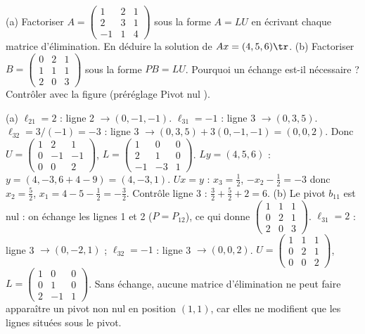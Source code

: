 \begin{exo}[S][$A=LU$ et $PA=LU$]
(a) Factoriser $A=\begin{pmatrix}1&2&1\\2&3&1\\-1&1&4\end{pmatrix}$ sous la forme $A=LU$ en écrivant chaque matrice d'élimination. En déduire la solution de $Ax=(4,5,6)\tr$.
(b) Factoriser $B=\begin{pmatrix}0&2&1\\1&1&1\\2&0&3\end{pmatrix}$ sous la forme $PB=LU$. Pourquoi un échange est-il nécessaire ? Contrôler avec la figure (préréglage \og Pivot nul \fg).
\begin{corrige}
(a) $\ell_{21}=2$ : ligne 2 $\to(0,-1,-1)$. $\ell_{31}=-1$ : ligne 3 $\to(0,3,5)$. $\ell_{32}=3/(-1)=-3$ : ligne 3 $\to(0,3,5)+3(0,-1,-1)=(0,0,2)$. Donc $U=\begin{pmatrix}1&2&1\\0&-1&-1\\0&0&2\end{pmatrix}$, $L=\begin{pmatrix}1&0&0\\2&1&0\\-1&-3&1\end{pmatrix}$. $Ly=(4,5,6)$ : $y=(4,-3,6+4-9)=(4,-3,1)$. $Ux=y$ : $x_3=\frac12$, $-x_2-\frac12=-3$ donc $x_2=\frac52$, $x_1=4-5-\frac12=-\frac32$. Contrôle ligne 3 : $\frac32+\frac52+2=6$.
(b) Le pivot $b_{11}$ est nul : on échange les lignes 1 et 2 ($P=P_{12}$), ce qui donne $\begin{pmatrix}1&1&1\\0&2&1\\2&0&3\end{pmatrix}$. $\ell_{31}=2$ : ligne 3 $\to(0,-2,1)$ ; $\ell_{32}=-1$ : ligne 3 $\to(0,0,2)$. $U=\begin{pmatrix}1&1&1\\0&2&1\\0&0&2\end{pmatrix}$, $L=\begin{pmatrix}1&0&0\\0&1&0\\2&-1&1\end{pmatrix}$. Sans échange, aucune matrice d'élimination ne peut faire apparaître un pivot non nul en position $(1,1)$, car elles ne modifient que les lignes situées sous le pivot.
\end{corrige}
\end{exo}
